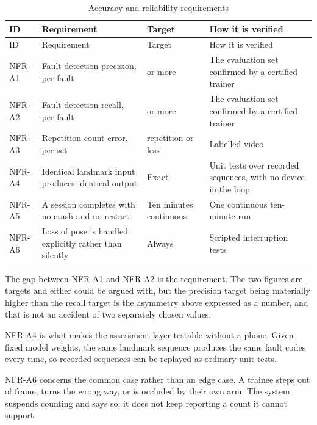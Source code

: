 {\footnotesize
\setlength{\LTpre}{6pt}\setlength{\LTpost}{8pt}
\begin{longtable}{>{\raggedright\arraybackslash}p{}>{\raggedright\arraybackslash}p{}>{\raggedright\arraybackslash}p{}>{\raggedright\arraybackslash}p{}}
\caption{Accuracy and reliability requirements}\\
\toprule
ID & Requirement & Target & How it is verified \\
\midrule
\endfirsthead
\toprule
ID & Requirement & Target & How it is verified \\
\midrule
\endhead
\bottomrule
\endfoot
\bottomrule
\endlastfoot
NFR-A1 & Fault detection precision, per fault & 0.90 or more & The evaluation set confirmed by a certified trainer \\
NFR-A2 & Fault detection recall, per fault & 0.70 or more & The evaluation set confirmed by a certified trainer \\
NFR-A3 & Repetition count error, per set & 1 repetition or less & Labelled video \\
NFR-A4 & Identical landmark input produces identical output & Exact & Unit tests over recorded sequences, with no device in the loop \\
NFR-A5 & A session completes with no crash and no restart & Ten minutes continuous & One continuous ten-minute run \\
NFR-A6 & Loss of pose is handled explicitly rather than silently & Always & Scripted interruption tests \\
\end{longtable}
}

The gap between NFR-A1 and NFR-A2 is the requirement. The two figures are targets and either could be argued with, but the precision target being materially higher than the recall target is the asymmetry above expressed as a number, and that is not an accident of two separately chosen values.

NFR-A4 is what makes the assessment layer testable without a phone. Given fixed model weights, the same landmark sequence produces the same fault codes every time, so recorded sequences can be replayed as ordinary unit tests.

NFR-A6 concerns the common case rather than an edge case. A trainee steps out of frame, turns the wrong way, or is occluded by their own arm. The system suspends counting and says so; it does not keep reporting a count it cannot support.


